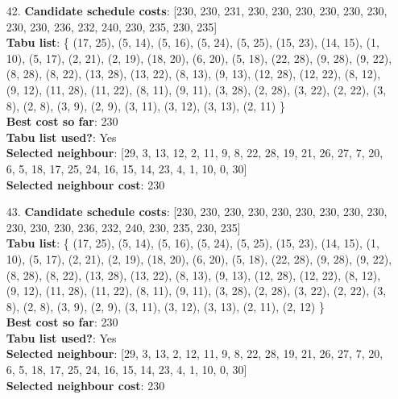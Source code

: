 \documentclass[fleqn]{article}
\begin{document}
\begin{itemize}
    \item[42.] \textbf{Candidate schedule costs}: [230, 230, 231, 230, 230, 230, 230, 230, 230, 230, 230, 236, 232, 240, 230, 235, 230, 235] \\
    \textbf{Tabu list}: \{ (17, 25), (5, 14), (5, 16), (5, 24), (5, 25), (15, 23), (14, 15), (1, 10), (5, 17), (2, 21), (2, 19), (18, 20), (6, 20), (5, 18), (22, 28), (9, 28), (9, 22), (8, 28), (8, 22), (13, 28), (13, 22), (8, 13), (9, 13), (12, 28), (12, 22), (8, 12), (9, 12), (11, 28), (11, 22), (8, 11), (9, 11), (3, 28), (2, 28), (3, 22), (2, 22), (3, 8), (2, 8), (3, 9), (2, 9), (3, 11), (3, 12), (3, 13), (2, 11) \} \\
    \textbf{Best cost so far}: 230 \\
    \textbf{Tabu list used?}: Yes \\
    \textbf{Selected neighbour}: [29, 3, 13, 12, 2, 11, 9, 8, 22, 28, 19, 21, 26, 27, 7, 20, 6, 5, 18, 17, 25, 24, 16, 15, 14, 23, 4, 1, 10, 0, 30] \\
    \textbf{Selected neighbour cost}: 230
      

    \item[43.] \textbf{Candidate schedule costs}: [230, 230, 230, 230, 230, 230, 230, 230, 230, 230, 230, 230, 236, 232, 240, 230, 235, 230, 235] \\
    \textbf{Tabu list}: \{ (17, 25), (5, 14), (5, 16), (5, 24), (5, 25), (15, 23), (14, 15), (1, 10), (5, 17), (2, 21), (2, 19), (18, 20), (6, 20), (5, 18), (22, 28), (9, 28), (9, 22), (8, 28), (8, 22), (13, 28), (13, 22), (8, 13), (9, 13), (12, 28), (12, 22), (8, 12), (9, 12), (11, 28), (11, 22), (8, 11), (9, 11), (3, 28), (2, 28), (3, 22), (2, 22), (3, 8), (2, 8), (3, 9), (2, 9), (3, 11), (3, 12), (3, 13), (2, 11), (2, 12) \} \\
    \textbf{Best cost so far}: 230 \\
    \textbf{Tabu list used?}: Yes \\
    \textbf{Selected neighbour}: [29, 3, 13, 2, 12, 11, 9, 8, 22, 28, 19, 21, 26, 27, 7, 20, 6, 5, 18, 17, 25, 24, 16, 15, 14, 23, 4, 1, 10, 0, 30] \\
    \textbf{Selected neighbour cost}: 230
      


\end{itemize}
\end{document}
